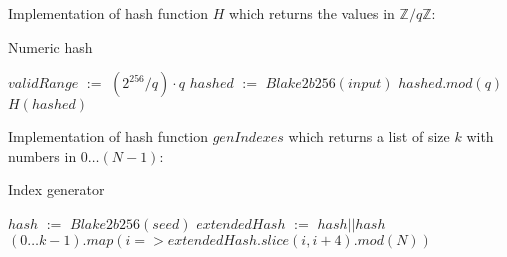 \documentclass[]{article}
\def\Let#1#2{\State #1 $:=$ #2}
\begin{document}
    Implementation of hash function $H$ which returns the values in $\mathbb{Z}/q\mathbb{Z}$:

    \begin{algorithm}[H]
        \caption{Numeric hash}
        \label{alg:H}
        \begin{algorithmic}[1]
            \Let{$validRange$}{$(2^{256} / q) \cdot q$}
            \Let{$hashed$}{$Blake2b256(input)$}
            \State \Return $hashed.mod(q)$
            \Else
            \State \Return $H(hashed)$
            \EndIf
            \EndFunction
        \end{algorithmic}
    \end{algorithm}

    Implementation of hash function $genIndexes$ which returns a list of size $k$ with numbers in $0\dots (N-1)$:

    \begin{algorithm}[H]
        \caption{Index generator}
        \label{alg:genIndexes}
        \begin{algorithmic}[1]
            \Let{$hash$}{$Blake2b256(seed)$}
            \Let{$extendedHash$}{$hash||hash$}
            \State \Return $(0\dots{k-1}).map(i => extendedHash.slice(i,i+4).mod(N))$
            \EndFunction
        \end{algorithmic}
    \end{algorithm}
\end{document}
